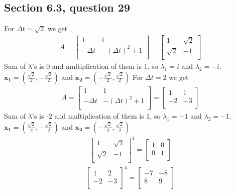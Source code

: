 \documentclass[a4paper,11pt]{article}
\newcommand{\mybf}[1]{\boldsymbol{#1}}
\begin{document}
\subsection*{Section 6.3, question 29}
For $\Delta t = \sqrt{2}$ we get
\begin{align*}
A = 
\begin{bmatrix}
1 & 1 \\
-\Delta t & -{(\Delta t)}^2+1 \\
\end{bmatrix}
=
\begin{bmatrix}
1 & \sqrt{2} \\
\sqrt{2} & -1 \\
\end{bmatrix}
\end{align*} 
Sum of $\lambda$'s is 0 and multiplication of them is 1, so $\lambda_1=i$ and $\lambda_2=-i$. \\
$\mybf{x_1}=(\frac{\sqrt{2}}{2}, -\frac{\sqrt{2}}{2})$ and $\mybf{x_2}=(-\frac{\sqrt{2}}{2}, \frac{\sqrt{2}}{2})$
For $\Delta t = 2$ we get
\begin{align*}
A = 
\begin{bmatrix}
1 & 1 \\
-\Delta t & -{(\Delta t)}^2+1 \\
\end{bmatrix}
=
\begin{bmatrix}
1 & 1 \\
-2 & -3 \\
\end{bmatrix}
\end{align*} 
Sum of $\lambda$'s is -2 and multiplication of them is 1, so $\lambda_1=-1$ and $\lambda_2=-1$.
$\mybf{x_1}=(\frac{\sqrt{2}}{2}, -\frac{\sqrt{2}}{2})$ and $\mybf{x_2}=(-\frac{\sqrt{2}}{2}, \frac{\sqrt{2}}{2})$
\begin{align*}
\begin{bmatrix}
1 & \sqrt{2} \\
\sqrt{2} & -1 \\
\end{bmatrix}^4=
\begin{bmatrix}
1 & 0 \\
0 & 1 \\
\end{bmatrix}
\end{align*}
\begin{align*}
\begin{bmatrix}
1 & 2 \\
-2 & -3 \\
\end{bmatrix}^4=
\begin{bmatrix}
-7 & -8 \\
8 & 9 \\
\end{bmatrix}
\end{align*}
\end{document}

